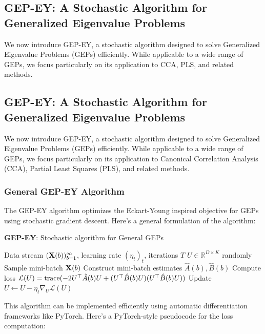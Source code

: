 \subsection{GEP-EY: A Stochastic Algorithm for Generalized Eigenvalue Problems}

We now introduce GEP-EY, a stochastic algorithm designed to solve Generalized Eigenvalue Problems (GEPs) efficiently. While applicable to a wide range of GEPs, we focus particularly on its application to CCA, PLS, and related methods.

\subsection{GEP-EY: A Stochastic Algorithm for Generalized Eigenvalue Problems}

We now introduce GEP-EY, a stochastic algorithm designed to solve Generalized Eigenvalue Problems (GEPs) efficiently. While applicable to a wide range of GEPs, we focus particularly on its application to Canonical Correlation Analysis (CCA), Partial Least Squares (PLS), and related methods.

\subsubsection{General GEP-EY Algorithm}

The GEP-EY algorithm optimizes the Eckart-Young inspired objective for GEPs using stochastic gradient descent. Here's a general formulation of the algorithm:

\begin{algorithm}
\caption{\textbf{GEP-EY}: Stochastic algorithm for General GEPs}
\label{alg:general_gep}
\begin{algorithmic}
 Data stream $(\mathbf{X}(b))_{b=1}^\infty$, learning rate $(\eta_t)_t$, iterations $T$
 $U \in \mathbb{R}^{D \times K}$ randomly
\STATE Sample mini-batch $\mathbf{X}(b)$
\STATE Construct mini-batch estimates $\hat{A}(b), \hat{B}(b)$
\STATE Compute loss $\mathcal{L}(U) = \operatorname{trace}(-2U^\top \hat{A}(b) U + (U^\top \hat{B}(b) U)(U^\top \hat{B}(b) U))$
\STATE Update $U \leftarrow U - \eta_t \nabla_U \mathcal{L}(U)$
\ENDFOR
\end{algorithmic}
\end{algorithm}

This algorithm can be implemented efficiently using automatic differentiation frameworks like PyTorch. Here's a PyTorch-style pseudocode for the loss computation:

